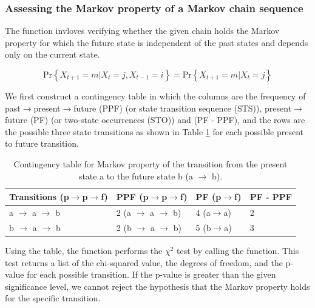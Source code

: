 \documentclass[nojss]{jss}
\begin{document}
\subsubsection{Assessing the Markov property of a Markov chain sequence}

The  function invloves verifying whether the given chain holds the Markov property for which the future state is independent of the past states and depends only on the current state.

\begin{equation}
\textrm{Pr}\left\{ X_{t+1}=m | X_t = j, X_{t-1} = i \right\} = \textrm{Pr}\left\{X_{t+1}=m | X_t = j \right\}
\label{eq:property}
\end{equation}

We first construct a contingency table in which the columns are the frequency of past$\rightarrow$present$\rightarrow$future (PPF) (or state transition sequence (STS)), present$\rightarrow$future (PF) (or two-state occurrences (STO)) and (PF - PPF), and the rows are the possible three state transitions as shown in Table \ref{tab:property} for each possible present to future transition.

\begin{table}[h]
  \centering
  \begin{tabular}{l | l | l | l}
    \hline
  Transitions (p$\rightarrow$p$\rightarrow$f) & PPF (p$\rightarrow$p$\rightarrow$f) & PF (p$\rightarrow$f) & PF - PPF \\
    \hline  \hline
  a $\rightarrow$ a $\rightarrow$ b & 2 (a $\rightarrow$ a $\rightarrow$ b) & 4 (a$\rightarrow$a) & 2\\
  b $\rightarrow$ a $\rightarrow$ b & 2 (b $\rightarrow$ a $\rightarrow$ b) & 5 (b$\rightarrow$a) & 3\\
  \hline
\end{tabular}
\caption{Contingency table for Markov property of the transition from the present state a to the future state b (a $\rightarrow$ b).}
\label{tab:property}
\end{table} 

Using the table, the function performs the $\chi ^2$ test by calling the  function.
This test returns a list of the chi-squared value, the degrees of freedom, and the p-value for each possible transition. If the p-value is greater than the given significance level, we cannot reject the hypothesis that the Markov property holds for the specific transition. 
\end{document}
